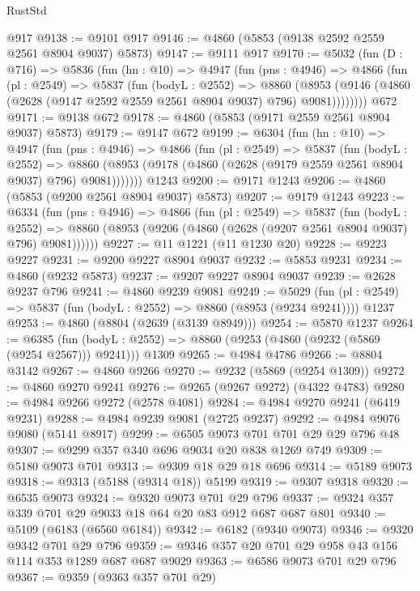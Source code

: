 \begin{lexlean}{RustStd}
\begin{coremodule}
    @917
@9138 := @9101 @917
@9146 := @4860 (@5853 (@9138 @2592 @2559 @2561 @8904 @9037) @5873)
@9147 := @9111 @917
@9170 := @5032
    (fun (D : @716) =>
    @5836
      (fun (hn : @10) =>
      @4947
        (fun (pns : @4946) =>
        @4866
          (fun (pl : @2549) =>
          @5837
            (fun (bodyL : @2552) =>
            @8860
              (@8953 (@9146 (@4860 (@2628 (@9147 @2592 @2559 @2561 @8904 @9037) @796) @9081))))))))
    @672
@9171 := @9138 @672
@9178 := @4860 (@5853 (@9171 @2559 @2561 @8904 @9037) @5873)
@9179 := @9147 @672
@9199 := @6304
    (fun (hn : @10) =>
    @4947
      (fun (pns : @4946) =>
      @4866
        (fun (pl : @2549) =>
        @5837
          (fun (bodyL : @2552) =>
          @8860 (@8953 (@9178 (@4860 (@2628 (@9179 @2559 @2561 @8904 @9037) @796) @9081)))))))
    @1243
@9200 := @9171 @1243
@9206 := @4860 (@5853 (@9200 @2561 @8904 @9037) @5873)
@9207 := @9179 @1243
@9223 := @6334
    (fun (pns : @4946) =>
    @4866
      (fun (pl : @2549) =>
      @5837
        (fun (bodyL : @2552) =>
        @8860 (@8953 (@9206 (@4860 (@2628 (@9207 @2561 @8904 @9037) @796) @9081))))))
@9227 := @11 @1221 (@11 @1230 @20)
@9228 := @9223 @9227
@9231 := @9200 @9227 @8904 @9037
@9232 := @5853 @9231
@9234 := @4860 (@9232 @5873)
@9237 := @9207 @9227 @8904 @9037
@9239 := @2628 @9237 @796
@9241 := @4860 @9239 @9081
@9249 := @5029
    (fun (pl : @2549) => @5837 (fun (bodyL : @2552) => @8860 (@8953 (@9234 @9241))))
    @1237
@9253 := @4860 (@8804 (@2639 (@3139 @8949)))
@9254 := @5870 @1237
@9264 := @6385
    (fun (bodyL : @2552) => @8860 (@9253 (@4860 (@9232 (@5869 (@9254 @2567))) @9241)))
    @1309
@9265 := @4984 @4786
@9266 := @8804 @3142
@9267 := @4860 @9266
@9270 := @9232 (@5869 (@9254 @1309))
@9272 := @4860 @9270 @9241
@9276 := @9265 (@9267 @9272) (@4322 @4783)
@9280 := @4984 @9266 @9272 (@2578 @4081)
@9284 := @4984 @9270 @9241 (@6419 @9231)
@9288 := @4984 @9239 @9081 (@2725 @9237)
@9292 := @4984 @9076 @9080 (@5141 @8917)
@9299 := @6505 @9073 @701 @701 @29 @29 @796 @48
@9307 := @9299 @357 @340 @696 @9034 @20 @838 @1269 @749
@9309 := @5180 @9073 @701
@9313 := @9309 @18 @29 @18 @696
@9314 := @5189 @9073
@9318 := @9313 (@5188 (@9314 @18)) @5199
@9319 := @9307 @9318
@9320 := @6535 @9073
@9324 := @9320 @9073 @701 @29 @796
@9337 := @9324 @357 @339 @701 @29 @9033 @18 @64 @20 @83 @912 @687 @687 @801
@9340 := @5109 (@6183 (@6560 @6184))
@9342 := @6182 (@9340 @9073)
@9346 := @9320 @9342 @701 @29 @796
@9359 := @9346 @357 @20 @701 @29 @958 @43 @156 @114 @353 @1289 @687 @687 @9029
@9363 := @6586 @9073 @701 @29 @796
@9367 := @9359 (@9363 @357 @701 @29)

\end{coremodule}
\end{lexlean}
